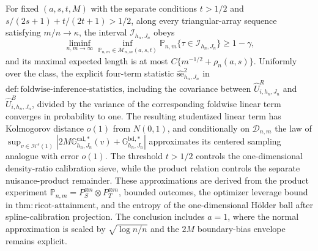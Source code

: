 For fixed \((a,s,t,M)\) with the separate conditions \(t>1/2\) and \(s/(2s+1)+t/(2t+1)>1/2\), along every triangular-array sequence satisfying \(m/n\to\kappa\), the interval \(\mathcal I_{h_n,J_n}\) obeys \[\liminf_{n,m\to\infty}\inf_{\mathbb P_{n,m}\in\mathcal M_{n,m}(a,s,t)}\mathbb P_{n,m}\{\tau\in\mathcal I_{h_n,J_n}\}\ge1-\gamma,\] and its maximal expected length is at most \(C\{m^{-1/2}+\rho_n(a,s)\}\). Uniformly over the class, the explicit four-term statistic \(\widehat{\mathrm{se}}_{h_n,J_n}^2\) in \(\mathrm{def:foldwise\text{-}inference\text{-}statistics}\), including the covariance between \(\widehat U^R_{i,h_n,J_n}\) and \(\widehat U^B_{i,h_n,J_n}\), divided by the variance of the corresponding foldwise linear term converges in probability to one. The resulting studentized linear term has Kolmogorov distance \(o(1)\) from \(N(0,1)\), and conditionally on \(\mathcal D_{n,m}\) the law of \(\sup_{v\in\mathcal H^s(1)}|2M\mathbb G^{\mathrm{cal},*}_{h_n,J_n}(v)+\mathbb G^{\mathrm{bd},*}_{h_n,J_n}|\) approximates its centered sampling analogue with error \(o(1)\). The threshold \(t>1/2\) controls the one-dimensional density-ratio calibration sieve, while the product relation controls the separate nuisance-product remainder. These approximations are derived from the product experiment \(\mathbb P_{n,m}=P_S^{\otimes n}\otimes P_T^{\otimes m}\), bounded outcomes, the optimizer leverage bound in \(\mathrm{thm:ricot\text{-}attainment}\), and the entropy of the one-dimensional Hölder ball after spline-calibration projection. The conclusion includes \(a=1\), where the normal approximation is scaled by \(\sqrt{\log n/n}\) and the \(2M\) boundary-bias envelope remains explicit.